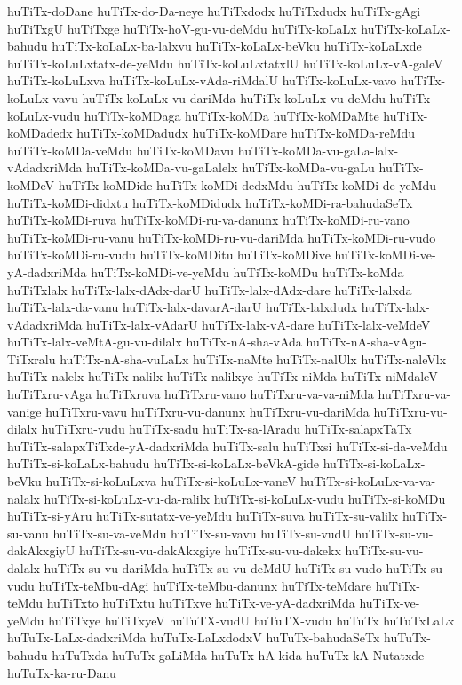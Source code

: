 {huTiTx-doDane
huTiTx-do-Da-neye
huTiTxdodx
huTiTxdudx
huTiTx-gAgi
huTiTxgU
huTiTxge
huTiTx-hoV-gu-vu-deMdu
huTiTx-koLaLx
huTiTx-koLaLx-bahudu
huTiTx-koLaLx-ba-lalxvu
huTiTx-koLaLx-beVku
huTiTx-koLaLxde
huTiTx-koLuLxtatx-de-yeMdu
huTiTx-koLuLxtatxlU
huTiTx-koLuLx-vA-galeV
huTiTx-koLuLxva
huTiTx-koLuLx-vAda-riMdalU
huTiTx-koLuLx-vavo
huTiTx-koLuLx-vavu
huTiTx-koLuLx-vu-dariMda
huTiTx-koLuLx-vu-deMdu
huTiTx-koLuLx-vudu
huTiTx-koMDaga
huTiTx-koMDa
huTiTx-koMDaMte
huTiTx-koMDadedx
huTiTx-koMDadudx
huTiTx-koMDare
huTiTx-koMDa-reMdu
huTiTx-koMDa-veMdu
huTiTx-koMDavu
huTiTx-koMDa-vu-gaLa-lalx-vAdadxriMda
huTiTx-koMDa-vu-gaLalelx
huTiTx-koMDa-vu-gaLu
huTiTx-koMDeV
huTiTx-koMDide
huTiTx-koMDi-dedxMdu
huTiTx-koMDi-de-yeMdu
huTiTx-koMDi-didxtu
huTiTx-koMDidudx
huTiTx-koMDi-ra-bahudaSeTx
huTiTx-koMDi-ruva
huTiTx-koMDi-ru-va-danunx
huTiTx-koMDi-ru-vano
huTiTx-koMDi-ru-vanu
huTiTx-koMDi-ru-vu-dariMda
huTiTx-koMDi-ru-vudo
huTiTx-koMDi-ru-vudu
huTiTx-koMDitu
huTiTx-koMDive
huTiTx-koMDi-ve-yA-dadxriMda
huTiTx-koMDi-ve-yeMdu
huTiTx-koMDu
huTiTx-koMda
huTiTxlalx
huTiTx-lalx-dAdx-darU
huTiTx-lalx-dAdx-dare
huTiTx-lalxda
huTiTx-lalx-da-vanu
huTiTx-lalx-davarA-darU
huTiTx-lalxdudx
huTiTx-lalx-vAdadxriMda
huTiTx-lalx-vAdarU
huTiTx-lalx-vA-dare
huTiTx-lalx-veMdeV
huTiTx-lalx-veMtA-gu-vu-dilalx
huTiTx-nA-sha-vAda
huTiTx-nA-sha-vAgu-TiTxralu
huTiTx-nA-sha-vuLaLx
huTiTx-naMte
huTiTx-nalUlx
huTiTx-naleVlx
huTiTx-nalelx
huTiTx-nalilx
huTiTx-nalilxye
huTiTx-niMda
huTiTx-niMdaleV
huTiTxru-vAga
huTiTxruva
huTiTxru-vano
huTiTxru-va-va-niMda
huTiTxru-va-vanige
huTiTxru-vavu
huTiTxru-vu-danunx
huTiTxru-vu-dariMda
huTiTxru-vu-dilalx
huTiTxru-vudu
huTiTx-sadu
huTiTx-sa-lAradu
huTiTx-salapxTaTx
huTiTx-salapxTiTxde-yA-dadxriMda
huTiTx-salu
huTiTxsi
huTiTx-si-da-veMdu
huTiTx-si-koLaLx-bahudu
huTiTx-si-koLaLx-beVkA-gide
huTiTx-si-koLaLx-beVku
huTiTx-si-koLuLxva
huTiTx-si-koLuLx-vaneV
huTiTx-si-koLuLx-va-va-nalalx
huTiTx-si-koLuLx-vu-da-ralilx
huTiTx-si-koLuLx-vudu
huTiTx-si-koMDu
huTiTx-si-yAru
huTiTx-sutatx-ve-yeMdu
huTiTx-suva
huTiTx-su-valilx
huTiTx-su-vanu
huTiTx-su-va-veMdu
huTiTx-su-vavu
huTiTx-su-vudU
huTiTx-su-vu-dakAkxgiyU
huTiTx-su-vu-dakAkxgiye
huTiTx-su-vu-dakekx
huTiTx-su-vu-dalalx
huTiTx-su-vu-dariMda
huTiTx-su-vu-deMdU
huTiTx-su-vudo
huTiTx-su-vudu
huTiTx-teMbu-dAgi
huTiTx-teMbu-danunx
huTiTx-teMdare
huTiTx-teMdu
huTiTxto
huTiTxtu
huTiTxve
huTiTx-ve-yA-dadxriMda
huTiTx-ve-yeMdu
huTiTxye
huTiTxyeV
huTuTX-vudU
huTuTX-vudu
huTuTx
huTuTxLaLx
huTuTx-LaLx-dadxriMda
huTuTx-LaLxdodxV
huTuTx-bahudaSeTx
huTuTx-bahudu
huTuTxda
huTuTx-gaLiMda
huTuTx-hA-kida
huTuTx-kA-Nutatxde
huTuTx-ka-ru-Danu
}
